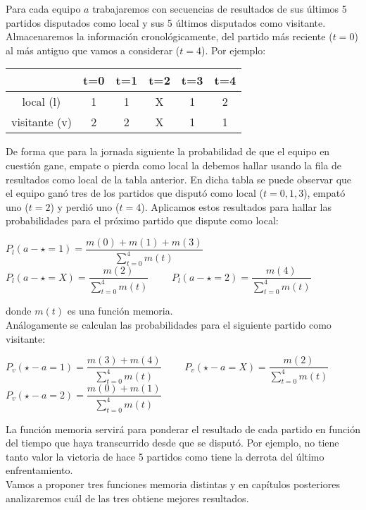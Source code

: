Para cada equipo $a$ trabajaremos con secuencias de resultados de sus últimos 5 partidos disputados como local y sus 5 últimos disputados como visitante. Almacenaremos la información cronológicamente, del partido más reciente ($t=0$) al más antiguo que vamos a considerar ($t=4$). Por ejemplo:
\begin{center}
	\begin{tabular}{|c|c|c|c|c|c|}
	\hline  & t=0 & t=1 & t=2 & t=3 & t=4 \\ 
	\hline local (l)  & 1 & 1 & X & 1 & 2\\ 
	\hline visitante (v) & 2 & 2 & X & 1 & 1\\ 
	\hline 
	\end{tabular} 
\end{center}
De forma que para la jornada siguiente la probabilidad de que el equipo en cuestión gane, empate o pierda como local la debemos hallar usando la fila de resultados como local de la tabla anterior. En dicha tabla se puede observar que el equipo ganó tres de los partidos que disputó como local ($t=0,1,3$), empató uno ($t=2$) y perdió uno ($t=4$). Aplicamos estos resultados para hallar las probabilidades para el próximo partido que dispute como local:
\begin{center}
$P_{l}(a - \star=1)=\dfrac{m(0)+m(1)+m(3)}{\sum_{t=0}^{4}m(t)}$\\
$P_{l}(a - \star=X)=\dfrac{m(2)}{\sum_{t=0}^{4}m(t)}$ \ \ \ \
$P_{l}(a - \star=2)=\dfrac{m(4)}{\sum_{t=0}^{4}m(t)}$
\end{center}
donde $m(t)$ es una función memoria.\\

Análogamente se calculan las probabilidades para el siguiente partido como visitante:
\begin{center}
	$P_{v}(\star - a=1)=\dfrac{m(3)+m(4)}{\sum_{t=0}^{4}m(t)}$ \ \ \ \
	$P_{v}(\star - a=X)=\dfrac{m(2)}{\sum_{t=0}^{4}m(t)}$\\
	$P_{v}(\star - a=2)=\dfrac{m(0)+m(1)}{\sum_{t=0}^{4}m(t)}$
\end{center}

La función memoria servirá para ponderar el resultado de cada partido en función del tiempo que haya transcurrido desde que se disputó. Por ejemplo, no tiene tanto valor la victoria de hace 5 partidos como tiene la derrota del último enfrentamiento.\\

Vamos a proponer tres funciones memoria distintas y en capítulos posteriores analizaremos cuál de las tres obtiene mejores resultados. 

